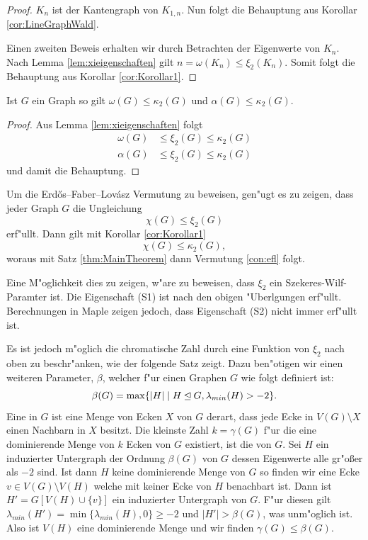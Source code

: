   \begin{proof}
    $K_n$ ist der Kantengraph von $K_{1,n}$. Nun folgt die Behauptung aus Korollar \ref{cor:LineGraphWald}.

    Einen zweiten Beweis erhalten wir durch Betrachten der Eigenwerte von $K_n$. Nach Lemma \ref{lem:xieigenschaften} gilt $n = \omega(K_n) \leq \xi_{2}(K_n)$. Somit folgt die Behauptung aus Korollar \ref{cor:Korollar1}.
  \end{proof}

  \begin{corollary}
    Ist $G$ ein Graph so gilt $\omega\left( G \right)\leq \kappa_{2}\left( G \right)$ und $\alpha\left( G \right)\leq \kappa_{2}\left( G \right)$.
    \label{cor:alphaomegakrausz}
  \end{corollary}

  \begin{proof}
    Aus Lemma \ref{lem:xieigenschaften} folgt
    \begin{align*}
      \omega(G) &\leq \xi_{2}(G) \leq \kappa_{2}(G) \\
      \alpha(G) &\leq \xi_{2}(G) \leq \kappa_{2}(G) 
    \end{align*}
    und damit die Behauptung.
  \end{proof}

  Um die Erd\H{o}s--Faber--Lov\'asz Vermutung zu beweisen, gen"ugt es zu zeigen, dass jeder Graph $G$ die Ungleichung $$\chi(G) \leq \xi_{2}(G)$$ erf"ullt. Dann gilt mit Korollar \ref{cor:Korollar1} $$\chi(G) \leq \kappa_{2}(G),$$  woraus mit Satz \ref{thm:MainTheorem} dann Vermutung \ref{con:efl} folgt.

  Eine M"oglichkeit dies zu zeigen, w"are zu beweisen, dass $\xi_2$ ein Szekeres-Wilf-Paramter ist. Die Eigenschaft (S1) ist nach den obigen "Uberlgungen erf"ullt. Berechnungen in Maple zeigen jedoch, dass Eigenschaft (S2) nicht immer erf"ullt ist. 

  Es ist jedoch m"oglich die chromatische Zahl durch eine Funktion von $\xi_2$ nach oben zu beschr"anken, wie der folgende Satz zeigt. Dazu ben"otigen wir einen weiteren Parameter, $\beta$, welcher f"ur einen Graphen $G$ wie folgt definiert ist:
  $$\beta(G) = \max\{|H| \;|\; H\unlhd G, \lambda_{min}(H) > -2 \}.$$
  Eine  in $G$ ist eine Menge von Ecken $X$ von $G$ derart, dass jede Ecke in $V(G)\setminus X$ einen Nachbarn in $X$ besitzt. Die kleinste Zahl $k=\gamma(G)$ f"ur die eine dominierende Menge von $k$ Ecken von $G$ existiert, ist die  von $G$. 
  Sei $H$ ein induzierter Untergraph der Ordnung $\beta(G)$ von $G$ dessen Eigenwerte alle gr"o{\ss}er als $-2$ sind. Ist dann $H$ keine dominierende Menge von $G$ so finden wir eine Ecke $v\in V(G) \setminus V(H)$ welche mit keiner Ecke von $H$ benachbart ist.
  Dann ist $H'=G[V(H)\cup \{v\}]$ ein induzierter Untergraph von $G$. F"ur diesen gilt $\lambda_{min}(H') = \min\{\lambda_{min}(H), 0\} \geq -2$ und $|H'| > \beta(G)$, was unm"oglich ist.
  Also ist $V(H)$ eine dominierende Menge und wir finden $\gamma (G) \leq \beta(G)$. 
  
